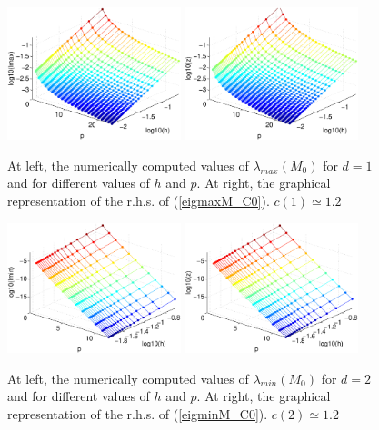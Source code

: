 \documentclass[11pt]{article}
\begin{document}
\begin{figure}[h]
\begin{center}
\includegraphics[width=0.45\textwidth]{Images/iga0_eigM1max.eps}\quad
\includegraphics[width=0.45\textwidth]{Images/iga0_eigM1smax.eps}\\
\end{center}
\caption{At left, the numerically computed values of 
$\lambda_{max}(M_0)$ for $d=1$ and 
for different values of $h$ and $p$. At right, 
the graphical representation of the r.h.s. of (\ref{eigmaxM_C0}). $c(1)
\simeq 1.2$}
\label{fig:massamax-iga0d1}
\end{figure}

\begin{figure}
\begin{center}
\includegraphics[width=0.45\textwidth]{Images/iga0_eigM2min.eps}\quad
\includegraphics[width=0.45\textwidth]{Images/iga0_eigM2smin.eps}\\
\end{center}
\caption{At left, the numerically computed values of
$\lambda_{min}(M_0)$ for $d=2$ and
for different values of $h$ and $p$. At right,
the graphical representation of the r.h.s. of (\ref{eigminM_C0}). $c(2)
\simeq 1.2$}
\label{fig:massamin-iga0d2}
\end{figure}
\end{document}
